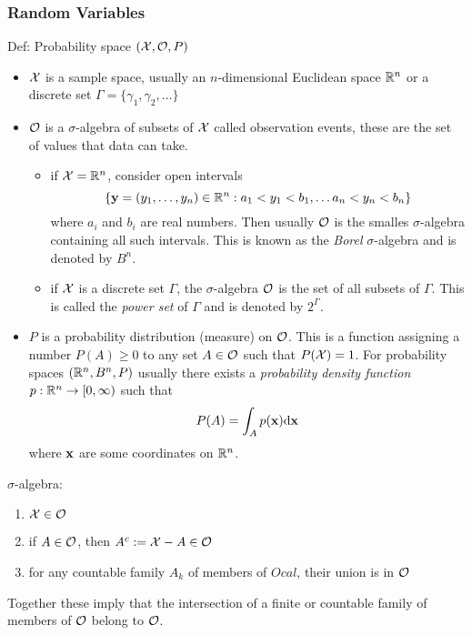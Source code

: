 \subsubsection{Random Variables}
Def: Probability space $(\mathcal{X}, \mathcal{O}, P)$  
\begin{itemize}
\item $\mathcal{X}$ is a sample space, usually an $n$-dimensional Euclidean space $\mathbb{R}^n$ or a discrete set $\Gamma=\{\gamma_1,\gamma_2, \ldots\}$
\item $\mathcal{O}$ is a $\sigma$-algebra of subsets of $\mathcal{X}$ called observation events, these are the set of values that data can take. 
\begin{itemize}
\item if $\mathcal{X}=\mathbb{R}^n$, consider open intervals 
\begin{equation}
\label{eq:openInts}
\{ {\mathbf{y}} = (y_1,\ldots, y_n)\in \mathbb{R}^n : a_1 < y_1 < b_1, \ldots a_n < y_n < b_n \}
\end{equation}
where $a_i$ and $b_i$ are real numbers. Then usually $\mathcal{O}$ is the smalles $\sigma$-algebra containing all such intervals. This is known as the \textit{Borel} $\sigma$-algebra and is denoted by $B^n$.
\item if $\mathcal{X}$ is a discrete set $\Gamma$, the $\sigma$-algebra $\mathcal{O}$ is the set of all subsets of $\Gamma$. This is called the \textit{power set} of $\Gamma$ and is denoted by $2^{\Gamma}$.
\end{itemize}
\item $P$ is a probability distribution (measure) on $\mathcal{O}$. This is a function assigning a number $P(A)\geq 0$ to any set $A\in \mathcal{O}$ such that $P(\mathcal{X})=1$. For probability spaces $(\mathbb{R}^n, B^n, P)$ usually there exists a \textit{probability density function} $p: \mathbb{R}^n \rightarrow [0,\infty) $ such that 
\begin{equation}
P(A)=\int_A p(\mathbf{x}) {\mbox{d}} \mathbf{x}
\end{equation}
where $\mathbf{x}$ are some coordinates on $\mathbb{R}^n$. 
\end{itemize}

$\sigma$-algebra:
\begin{enumerate}
\item $\mathcal{X} \in \mathcal{O}$
\item if $A \in \mathcal{O}$, then $A^c := \mathcal{X} - A \in \mathcal{O}$
\item for any countable family $A_k$ of members of $Ocal$, their union is in $\mathcal{O}$
\end{enumerate}
Together these imply that the intersection of a finite or countable family of members of $\mathcal{O}$ belong to $\mathcal{O}$.

